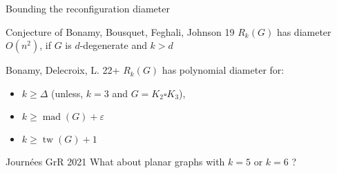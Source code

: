 \documentclass[11pt,xcolor=dvipsnames,presentation]{beamer}
\DeclareMathOperator{\mad}{mad}
\DeclareMathOperator{\tw}{tw}
\begin{document}
\begin{frame}{Bounding the reconfiguration diameter}
  \begin{alertblock}{Conjecture of Bonamy, Bousquet, Feghali, Johnson 19}  
    $R_k(G)$ has diameter $O(n^2)$, if $G$ is $d$-degenerate and $k > d$
  \end{alertblock}
  
  \begin{block}{Bonamy, Delecroix, L. 22+}
    $R_k(G)$ has polynomial diameter for: 
    \begin{itemize}
    \item $k \ge \Delta$ (unless, $k=3$ and $G = K_2 \square K_3$),
    \item $k \ge \mad(G) + \varepsilon$
    \item $k \ge \tw(G) +1$
    \end{itemize}
  \end{block}

  \begin{alertblock}{Journées GrR 2021}
    What about planar graphs with $k = 5$ or $k = 6$ ?
  \end{alertblock}

\end{frame}
\end{document}
